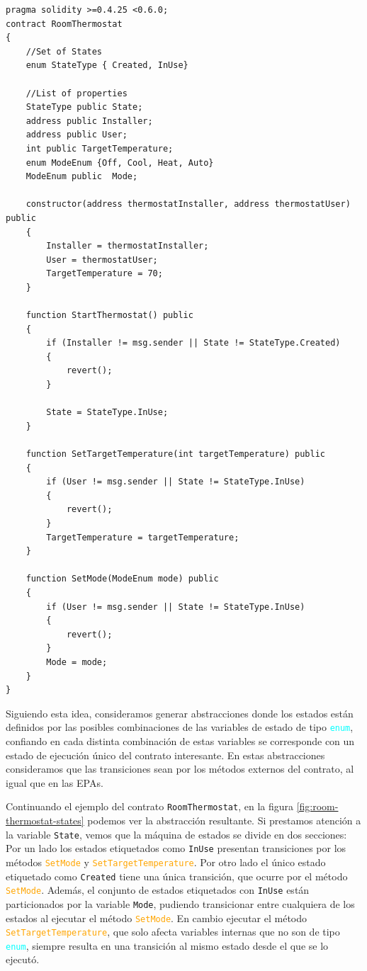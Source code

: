 \begin{lstlisting}[language=Solidity, label={fig:rooomthermostat-solidity}, caption={Contrato Inteligente \texttt{RoomThermostat} en Solidity},captionpos=b]
pragma solidity >=0.4.25 <0.6.0;
contract RoomThermostat
{
    //Set of States
    enum StateType { Created, InUse}
    
    //List of properties
    StateType public State;
    address public Installer;
    address public User;
    int public TargetTemperature;
    enum ModeEnum {Off, Cool, Heat, Auto}
    ModeEnum public  Mode;
    
    constructor(address thermostatInstaller, address thermostatUser) public
    {
        Installer = thermostatInstaller;
        User = thermostatUser;
        TargetTemperature = 70;
    }

    function StartThermostat() public
    {
        if (Installer != msg.sender || State != StateType.Created)
        {
            revert();
        }

        State = StateType.InUse;
    }

    function SetTargetTemperature(int targetTemperature) public
    {
        if (User != msg.sender || State != StateType.InUse)
        {
            revert();
        }
        TargetTemperature = targetTemperature;
    }

    function SetMode(ModeEnum mode) public
    {
        if (User != msg.sender || State != StateType.InUse)
        {
            revert();
        }
        Mode = mode;
    }
}
\end{lstlisting}

Siguiendo esta idea, consideramos generar abstracciones donde los estados están definidos por las posibles combinaciones de las variables de estado de tipo \textcolor{cyan}{\texttt{enum}}, confiando en cada distinta combinación	de estas variables se corresponde con un estado de ejecución único del contrato interesante.
En estas abstracciones consideramos que las transiciones sean por los métodos externos del contrato, al igual que en las EPAs.

Continuando el ejemplo del contrato \texttt{RoomThermostat}, en la figura \ref{fig:room-thermostat-states} podemos ver la abstracción resultante.
Si prestamos atención a la variable \texttt{State}, vemos que la máquina de estados se divide en dos secciones:
Por un lado los estados etiquetados como \texttt{InUse} presentan transiciones por los métodos \textcolor{orange}{\texttt{SetMode}} y \textcolor{orange}{\texttt{SetTargetTemperature}}.
Por otro lado el único estado etiquetado como \texttt{Created} tiene una única transición, que ocurre por el método \textcolor{orange}{\texttt{SetMode}}.
Además, el conjunto de estados etiquetados con \texttt{InUse} están particionados por la variable \texttt{Mode}, pudiendo transicionar entre cualquiera de los estados al ejecutar el método \textcolor{orange}{\texttt{SetMode}}.
En cambio ejecutar el método \textcolor{orange}{\texttt{SetTargetTemperature}}, que solo afecta variables internas que no son de tipo \textcolor{cyan}{\texttt{enum}}, siempre resulta en una transición al mismo estado desde el que se lo ejecutó.

